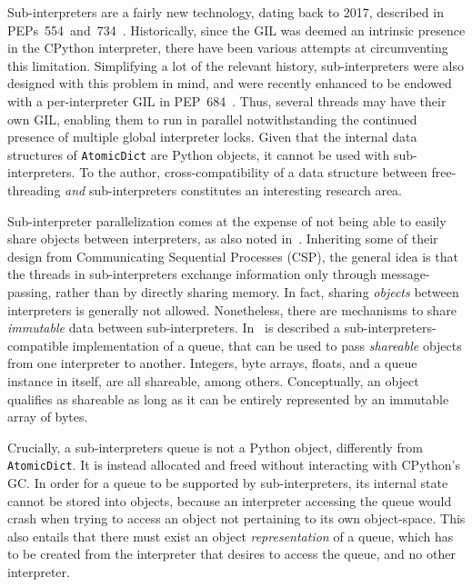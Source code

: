 Sub-interpreters are a fairly new technology, dating back to 2017, described in PEPs~554~and~734~\cite{pep554,pep734}.
Historically, since the GIL was deemed an intrinsic presence in the CPython interpreter, there have been various attempts at circumventing this limitation.
Simplifying a lot of the relevant history, sub-interpreters were also designed with this problem in mind, and were recently enhanced to be endowed with a per-interpreter GIL in PEP~684~\cite{pep684}.
Thus, several threads may have their own GIL, enabling them to run in parallel notwithstanding the continued presence of multiple global interpreter locks.
Given that the internal data structures of \texttt{AtomicDict} are Python objects, it cannot be used with sub-interpreters.
To the author, cross-compatibility of a data structure between free-threading \emph{and} sub-interpreters constitutes an interesting research area.

Sub-interpreter parallelization comes at the expense of not being able to easily share objects between interpreters, as also noted in~\cite[{\S}Per-Interpreter GIL]{pep703}.
Inheriting some of their design from Communicating Sequential Processes (CSP), the general idea is that the threads in sub-interpreters exchange information only through message-passing, rather than by directly sharing memory.
In fact, sharing \emph{objects} between interpreters is generally not allowed.
Nonetheless, there are mechanisms to share \emph{immutable} data between sub-interpreters.
In~\cite[\S Queue Objects]{pep734} is described a sub-interpreters-compatible implementation of a queue, that can be used to pass \emph{shareable} objects from one interpreter to another.
Integers, byte arrays, floats, and a queue instance in itself, are all shareable, among others.
Conceptually, an object qualifies as shareable as long as it can be entirely represented by an immutable array of bytes.

Crucially, a sub-interpreters queue is not a Python object, differently from \texttt{AtomicDict}.
It is instead allocated and freed without interacting with CPython's GC\@.
In order for a queue to be supported by sub-interpreters, its internal state cannot be stored into objects, because an interpreter accessing the queue would crash when trying to access an object not pertaining to its own object-space.
This also entails that there must exist an object \emph{representation} of a queue, which has to be created from the interpreter that desires to access the queue, and no other interpreter.

